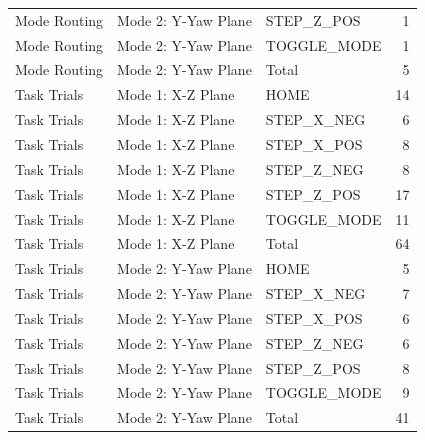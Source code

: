 \begin{table}[htbp]
\begin{tabular}{lllr}
Mode Routing & Mode 2: Y-Yaw Plane & STEP\_Z\_POS & 1 \\
Mode Routing & Mode 2: Y-Yaw Plane & TOGGLE\_MODE & 1 \\
Mode Routing & Mode 2: Y-Yaw Plane & Total & 5 \\
Task Trials & Mode 1: X-Z Plane & HOME & 14 \\
Task Trials & Mode 1: X-Z Plane & STEP\_X\_NEG & 6 \\
Task Trials & Mode 1: X-Z Plane & STEP\_X\_POS & 8 \\
Task Trials & Mode 1: X-Z Plane & STEP\_Z\_NEG & 8 \\
Task Trials & Mode 1: X-Z Plane & STEP\_Z\_POS & 17 \\
Task Trials & Mode 1: X-Z Plane & TOGGLE\_MODE & 11 \\
Task Trials & Mode 1: X-Z Plane & Total & 64 \\
Task Trials & Mode 2: Y-Yaw Plane & HOME & 5 \\
Task Trials & Mode 2: Y-Yaw Plane & STEP\_X\_NEG & 7 \\
Task Trials & Mode 2: Y-Yaw Plane & STEP\_X\_POS & 6 \\
Task Trials & Mode 2: Y-Yaw Plane & STEP\_Z\_NEG & 6 \\
Task Trials & Mode 2: Y-Yaw Plane & STEP\_Z\_POS & 8 \\
Task Trials & Mode 2: Y-Yaw Plane & TOGGLE\_MODE & 9 \\
Task Trials & Mode 2: Y-Yaw Plane & Total & 41 \\
\bottomrule
\end{tabular}
\end{table}
